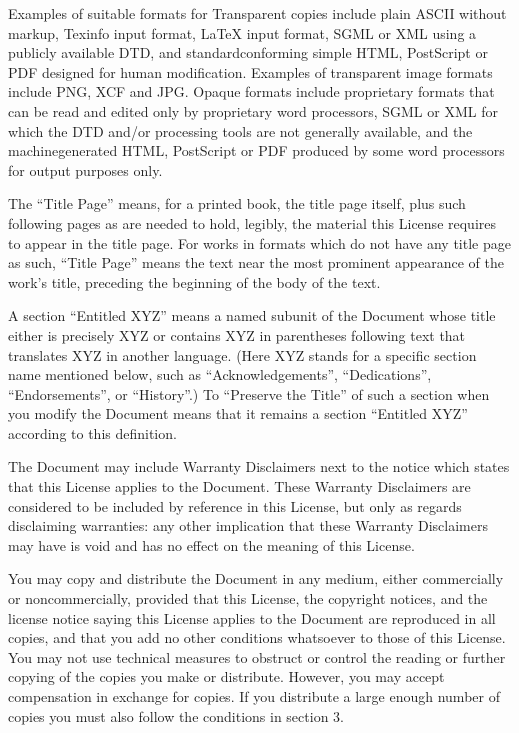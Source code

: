 \documentclass[letterpaper,10pt,english,openany,oneside]{sphinxmanual}
\begin{document}
\sphinxAtStartPar
Examples of suitable formats for Transparent copies include plain ASCII
without markup, Texinfo input format, LaTeX input format, SGML or XML
using a publicly available DTD, and standard\sphinxhyphen{}conforming simple HTML,
PostScript or PDF designed for human modification. Examples of
transparent image formats include PNG, XCF and JPG. Opaque formats
include proprietary formats that can be read and edited only by
proprietary word processors, SGML or XML for which the DTD and/or
processing tools are not generally available, and the machine\sphinxhyphen{}generated
HTML, PostScript or PDF produced by some word processors for output
purposes only.

\sphinxAtStartPar
The “Title Page” means, for a printed book, the title page itself, plus
such following pages as are needed to hold, legibly, the material this
License requires to appear in the title page. For works in formats which
do not have any title page as such, “Title Page” means the text near the
most prominent appearance of the work’s title, preceding the beginning
of the body of the text.

\sphinxAtStartPar
A section “Entitled XYZ” means a named subunit of the Document whose
title either is precisely XYZ or contains XYZ in parentheses following
text that translates XYZ in another language. (Here XYZ stands for a
specific section name mentioned below, such as “Acknowledgements”,
“Dedications”, “Endorsements”, or “History”.) To “Preserve the Title” of
such a section when you modify the Document means that it remains a
section “Entitled XYZ” according to this definition.

\sphinxAtStartPar
The Document may include Warranty Disclaimers next to the notice which
states that this License applies to the Document. These Warranty
Disclaimers are considered to be included by reference in this License,
but only as regards disclaiming warranties: any other implication that
these Warranty Disclaimers may have is void and has no effect on the
meaning of this License.

\sphinxAtStartPar
{}

\sphinxAtStartPar
You may copy and distribute the Document in any medium, either
commercially or noncommercially, provided that this License, the
copyright notices, and the license notice saying this License applies to
the Document are reproduced in all copies, and that you add no other
conditions whatsoever to those of this License. You may not use
technical measures to obstruct or control the reading or further copying
of the copies you make or distribute. However, you may accept
compensation in exchange for copies. If you distribute a large enough
number of copies you must also follow the conditions in section 3.
\end{document}
